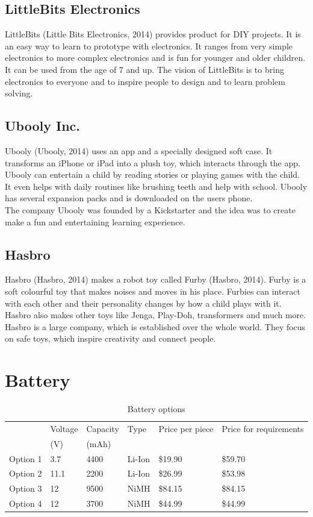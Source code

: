 \documentclass[11pt,twoside,a4paper]{report}
\begin{document}
\begin{appendices}
\section{LittleBits Electronics}
LittleBits (Little Bits Electronics, 2014) provides product for DIY projects. It is an easy way to learn to prototype with electronics. It ranges from very simple electronics to more complex electronics and is fun for younger and older children. It can be used from the age of 7 and up. The vision of LittleBits is to bring electronics to everyone and to inspire people to design and to learn problem solving.
\section{Ubooly Inc.}
Ubooly (Ubooly, 2014) uses an app and a specially designed soft case. It transforms an iPhone or iPad into a plush toy, which interacts through the app. Ubooly can entertain a child by reading stories or playing games with the child. It even helps with daily routines like brushing teeth and help with school. Ubooly has several expansion packs and is downloaded on the users phone. \\
The company Ubooly was founded by a Kickstarter and the idea was to create make a fun and entertaining learning experience.
\section{Hasbro}
Hasbro (Hasbro, 2014) makes a robot toy called Furby (Hasbro, 2014). Furby is a soft colourful toy that makes noises and moves in his place. Furbies can interact with each other and their personality changes by how a child plays with it.\\
Hasbro also makes other toys like Jenga, Play-Doh, transformers and much more. Hasbro is a large company, which is established over the whole world. They focus on safe toys, which inspire creativity and connect people.
\chapter{Battery}
\begin{table}[h]
\caption{Battery options}
\begin{tabular}{llllll}
  & Voltage  & Capacity & Type  & Price per piece & Price for requirements          \\
         & (V)      & (mAh) &                 &                        &         \\
Option 1 & 3.7      & 4400  & Li-Ion          & \$19.90                & \$59.70 \\
Option 2 & 11.1     & 2200  & Li-Ion          & \$26.99                & \$53.98 \\
Option 3 & 12       & 9500  & NiMH            & \$84.15                & \$84.15 \\
Option 4 & 12       & 3700  & NiMH            & \$44.99                & \$44.99
\end{tabular}
\label{table:batteryOptions}
\end{table}


\end{appendices}
\end{document}
